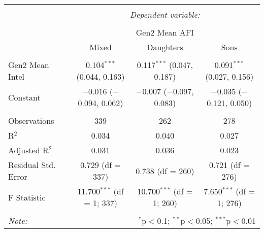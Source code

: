 
\begingroup 
\small 
\begin{tabular}{@{\extracolsep{1pt}}lccc} 
\\[-1.8ex]\hline 
\hline \\[-1.8ex] 
 & \multicolumn{3}{c}{\textit{Dependent variable:}} \\ 
\cline{2-4} 
\\[-1.8ex] & \multicolumn{3}{c}{Gen2 Mean AFI} \\ 
 & Mixed & Daughters & Sons \\ 
\hline \\[-1.8ex] 
 Gen2 Mean Intel & 0.104$^{***}$ (0.044, 0.163) & 0.117$^{***}$ (0.047, 0.187) & 0.091$^{***}$ (0.027, 0.156) \\ 
  Constant & $-$0.016 ($-$0.094, 0.062) & $-$0.007 ($-$0.097, 0.083) & $-$0.035 ($-$0.121, 0.050) \\ 
 \hline \\[-1.8ex] 
Observations & 339 & 262 & 278 \\ 
R$^{2}$ & 0.034 & 0.040 & 0.027 \\ 
Adjusted R$^{2}$ & 0.031 & 0.036 & 0.023 \\ 
Residual Std. Error & 0.729 (df = 337) & 0.738 (df = 260) & 0.721 (df = 276) \\ 
F Statistic & 11.700$^{***}$ (df = 1; 337) & 10.700$^{***}$ (df = 1; 260) & 7.650$^{***}$ (df = 1; 276) \\ 
\hline 
\hline \\[-1.8ex] 
\textit{Note:}  & \multicolumn{3}{r}{$^{*}$p$<$0.1; $^{**}$p$<$0.05; $^{***}$p$<$0.01} \\ 
\end{tabular} 
\endgroup 
